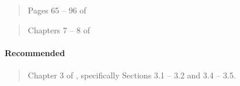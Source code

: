 \documentclass[12pt]{article}
\begin{document}
\begin{verse} Pages 65 -- 96 of  \end{verse}

\begin{verse} Chapters 7 -- 8 of  \end{verse}

\begin{verse}  \end{verse}

\paragraph*{Recommended}

\begin{verse}  \end{verse}

\begin{verse}  \end{verse}

\begin{verse}  \end{verse}

\begin{verse}  \end{verse}

\begin{verse}  \end{verse}

\begin{verse}  \end{verse}

\begin{verse}  \end{verse}

\begin{verse} Chapter 3 of , specifically Sections 3.1 -- 3.2 and 3.4 -- 3.5. \end{verse}

\begin{verse}  \end{verse}

\begin{verse}  \end{verse}

\begin{verse}  \end{verse}
\end{document}
